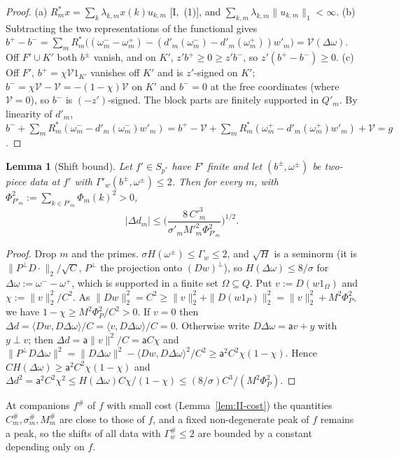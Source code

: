 \documentclass[10pt]{amsart}
\newtheorem{lemma}[theorem]{Lemma}
\theoremstyle{definition}
\theoremstyle{remark}
\newcommand{\ip}[2]{\langle #1,#2\rangle}
\begin{document}
\begin{proof}
(a) $R_m^*x=\sum_k\lambda_{k,m}x(k)u_{k,m}$ [I,~(1)], and $\sum_{k,m}
\lambda_{k,m}\|u_{k,m}\|_1<\infty$.  (b) Subtracting the two representations
of the functional gives $b^+-b^-=\sum_mR_m^*\big((\omega^-_m-\omega^+_m)-
(d'_m(\omega^-_m)-d'_m(\omega^+_m))w'_m\big)=\mathcal V(\Delta\omega)$.  Off
$F'\cup K'$ both $b^\pm$ vanish, and on $K'$, $z'b^+\ge0\ge z'b^-$, so
$z'(b^+-b^-)\ge0$.  (c) Off $F'$, $b^+=\chi\mathcal V1_{K'}$ vanishes off $K'$
and is $z'$-signed on $K'$; $b^-=\chi\mathcal V-\mathcal V=-(1-\chi)\mathcal V$
on $K'$ and $b^-=0$ at the free coordinates (where $\mathcal V=0$), so $b^-$
is $(-z')$-signed.  The block parts are finitely supported in $Q'_m$.  By
linearity of $d'_m$, $b^-+\sum_mR_m^*(\omega^-_m-d'_m(\omega^-_m)w'_m)=b^+-
\mathcal V+\sum_mR_m^*(\omega^+_m-d'_m(\omega^+_m)w'_m)+\mathcal V=g$.
\end{proof}

\begin{lemma}[Shift bound]\label{lem:II-shift}
Let $f'\in S_{p^*}$ have $F'$ finite and let $(b^\pm,\omega^\pm)$ be
two-piece data at $f'$ with $\Gamma'_w(b^\pm,\omega^\pm)\le2$.  Then for
every $m$, with $\Phi_{P'_m}^2:=\sum_{k\in P'_m}\Phi_m(k)^2>0$,
\[
 |\Delta d_m|\le\Big(\frac{8\,C'^3_m}{\sigma'_mM'^2_m\Phi_{P'_m}^2}\Big)^{1/2}.
\]
\end{lemma}

\begin{proof}
Drop $m$ and the primes.  $\sigma H(\omega^\pm)\le\Gamma_w\le2$, and
$\sqrt H$ is a seminorm (it is $\|P^\perp D\cdot\|_2/\sqrt C$, $P^\perp$
the projection onto $(Dw)^\perp$), so $H(\Delta\omega)\le8/\sigma$ for
$\Delta\omega:=\omega^--\omega^+$, which is supported in a finite set
$\Omega\subseteq Q$.  Put $v:=D(w1_\Omega)$ and $\chi:=\|v\|_2^2/C^2$.  As
$\|Dw\|_2^2=C^2\ge\|v\|_2^2+\|D(w1_P)\|_2^2=\|v\|_2^2+M^2\Phi_P^2$, we have
$1-\chi\ge M^2\Phi_P^2/C^2>0$.  If $v=0$ then $\Delta d=\ip{Dw}{D\Delta\omega}/C
=\ip{v}{D\Delta\omega}/C=0$.  Otherwise write $D\Delta\omega=\mathsf av+y$ with
$y\perp v$; then $\Delta d=\mathsf a\|v\|^2/C=\mathsf aC\chi$ and
$\|P^\perp D\Delta\omega\|^2=\|D\Delta\omega\|^2-\ip{Dw}{D\Delta\omega}^2/C^2\ge
\mathsf a^2C^2\chi(1-\chi)$.  Hence $CH(\Delta\omega)\ge\mathsf a^2C^2\chi(1-\chi)$
and $\Delta d^2=\mathsf a^2C^2\chi^2\le H(\Delta\omega)C\chi/(1-\chi)\le
(8/\sigma)C^3/(M^2\Phi_P^2)$.
\end{proof}

At companions $f^\#$ of $f$ with small cost (Lemma~\ref{lem:II-cost}) the
quantities $C^\#_m,\sigma^\#_m,M^\#_m$ are close to those of $f$, and a fixed
non-degenerate peak of $f$ remains a peak, so the shifts of all data with
$\Gamma^\#_w\le2$ are bounded by a constant depending only on $f$.
\end{document}
